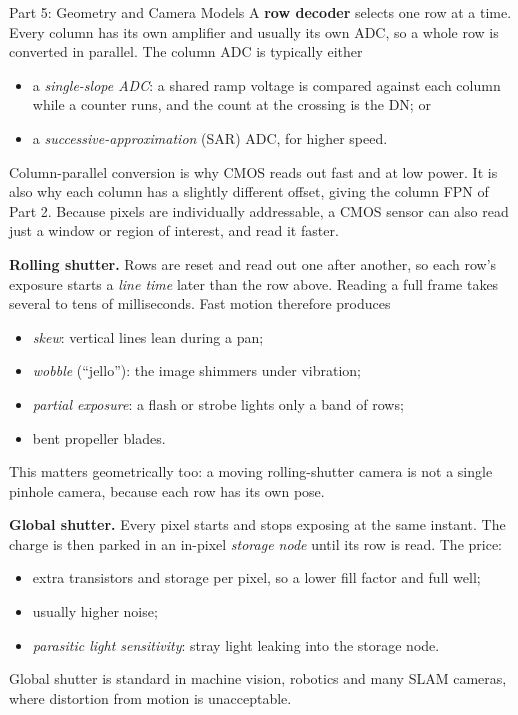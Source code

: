 \documentclass[letterpaper]{article}
\begin{document}
\begin{notes}{Part 5: Geometry and Camera Models}
A \textbf{row decoder} selects one row at a time. Every column has its own amplifier and usually its own ADC, so a whole row is converted in parallel. The column ADC is typically either
\begin{itemize}[noitemsep]
    \item a \emph{single-slope ADC}: a shared ramp voltage is compared against each column while a counter runs, and the count at the crossing is the DN; or
    \item a \emph{successive-approximation} (SAR) ADC, for higher speed.
\end{itemize}
Column-parallel conversion is why CMOS reads out fast and at low power. It is also why each column has a slightly different offset, giving the column FPN of Part 2. Because pixels are individually addressable, a CMOS sensor can also read just a window or region of interest, and read it faster.


\textbf{Rolling shutter.} Rows are reset and read out one after another, so each row's exposure starts a \emph{line time} later than the row above. Reading a full frame takes several to tens of milliseconds. Fast motion therefore produces
\begin{itemize}[noitemsep]
    \item \emph{skew}: vertical lines lean during a pan;
    \item \emph{wobble} (``jello''): the image shimmers under vibration;
    \item \emph{partial exposure}: a flash or strobe lights only a band of rows;
    \item bent propeller blades.
\end{itemize}
This matters geometrically too: a moving rolling-shutter camera is not a single pinhole camera, because each row has its own pose.

\textbf{Global shutter.} Every pixel starts and stops exposing at the same instant. The charge is then parked in an in-pixel \emph{storage node} until its row is read. The price:
\begin{itemize}[noitemsep]
    \item extra transistors and storage per pixel, so a lower fill factor and full well;
    \item usually higher noise;
    \item \emph{parasitic light sensitivity}: stray light leaking into the storage node.
\end{itemize}
Global shutter is standard in machine vision, robotics and many SLAM cameras, where distortion from motion is unacceptable.


\end{notes}
\end{document}
